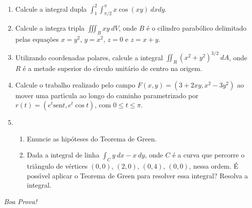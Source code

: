 \documentclass[a4paper,5pt]{amsbook}
\newcommand{\sen}{\text{sen}}
\newcommand{\ds}{\displaystyle}
\begin{document}
\vspace{0.2cm}
\begin{enumerate}

\item Calcule a integral dupla $\ds\int_1^2\int_{\pi/2}^{\pi} x\cos(xy)\ dxdy$.
\vspace{1cm}

\item Calcule a integra tripla $\ds\iiint_B xy\ dV$, onde $B$ \'e
	o cilindro parab\'olico delimitado pelas equa\c{c}\~oes $x=y^2$, $y=x^2$, $z=0$ e
	$z=x+y$.
\vspace{1cm}

\item Utilizando coordenadas polares, calcule a integral $\ds \iint_R
	{(x^2+y^2)}^{3/2}\ dA$, onde $R$ \'e a metade superior do c\'{\i}rculo unit\'ario de
	centro na origem.
\vspace{1cm}

\item Calcule o trabalho realizado pelo campo $F(x,y) = (3+2xy, x^2-3y^2)$ ao
	mover uma part\'{\i}cula ao longo do caminho parametrizado por $r(t) = (e^t\sen
	t, e^t\cos t)$, com $0\le t \le \pi$.
\vspace{1cm}

\item
	\begin{enumerate}
		\item Enuncie as hip\'oteses do Teorema de Green.
		\item Dada a integral de linha $\ds\int_C y\ dx - x\ dy$, onde $C$ \'e a
			curva que percorre o tri\^angulo de v\'ertices $(0,0)$, $(2,0)$, $(0,4)$,
			$(0,0)$, nessa ordem. \'{E} poss\'{\i}vel aplicar o Teorema de Green
			para resolver essa integral? Resolva a integral.
	\end{enumerate}

\end{enumerate}

\begin{flushright}
	\textit{Boa Prova!}
\end{flushright}
\end{document}
